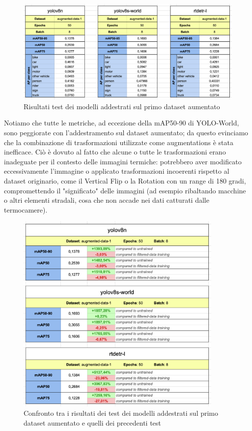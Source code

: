 \begin{figure}[ht]
    \centering
    \includegraphics[width=1\textwidth]{files/capitoli/4-sperimentazione-risultati/assets/augmented-data-1-metrics.png}
    \caption{\label{fig:augmented-data-1-metrics}Risultati test dei modelli addestrati sul primo dataset aumentato}
\end{figure}

Notiamo che tutte le metriche, ad eccezione della mAP50-90 di YOLO-World, sono peggiorate con l'addestramento sul dataset aumentato; da questo evinciamo che la combinazione di trasformazioni utilizzate come augmentations è stata inefficace. Ciò è dovuto al fatto che alcune o tutte le trasformazioni erano inadeguate per il contesto delle immagini termiche: potrebbero aver modificato eccessivamente l'immagine o applicato trasformazioni incoerenti rispetto al dataset originario, come il Vertical Flip o la Rotation con un range di 180 gradi, compromettendo il "significato" delle immagini (ad esempio ribaltando macchine o altri elementi stradali, cosa che non accade nei dati catturati dalle termocamere).

\clearpage

\begin{figure}[ht]
    \centering
    \includegraphics[width=0.9\textwidth]{files/capitoli/4-sperimentazione-risultati/assets/augmented-data-1-compare.png}
    \caption{\label{fig:augmented-data-1-compare}Confronto tra i risultati dei test dei modelli addestrati sul primo dataset aumentato e quelli dei precedenti test}
\end{figure}

